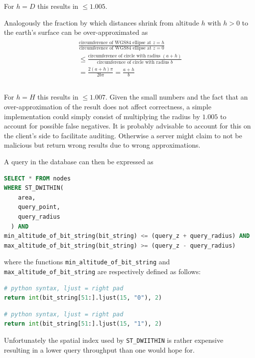 \documentclass[10pt,conference,compsocconf]{IEEEtran}
\begin{document}
For $h = D$ this results in $\leq 1.005$.

Analogously the fraction by which distances shrink from altitude $h$ with $h > 0$ to the earth's surface can be over-approximated as
\begin{align}
\begin{split}
	&\frac{\text{circumference of WGS84 ellipse at }z=h}{\text{circumference of WGS84 ellipse at }z=0}\\
	&\leq \frac{\text{circumference of circle with radius } (a+h)}{\text{circumference of circle with radius } b}\\
	&= \frac{2 (a+h) \pi}{2 b \pi} = \frac{a+h}{b}\\
	&\\
\end{split}
\end{align}

For $h = H$ this results in $\leq 1.007$.
Given the small numbers and the fact that an over-approximation of the result does not affect correctness, a simple implementation could simply consist of multiplying the radius by $1.005$ to account for possible false negatives.
It is probably advisable to account for this on the client's side to facilitate auditing.
Otherwise a server might claim to not be malicious but return wrong results due to wrong approximations.

A query in the database can then be expressed as

\begin{lstlisting}[language=SQL]
SELECT * FROM nodes
WHERE ST_DWITHIN(
    area,
    query_point,
    query_radius
  ) AND
min_altitude_of_bit_string(bit_string) <= (query_z + query_radius) AND
max_altitude_of_bit_string(bit_string) >= (query_z - query_radius)
\end{lstlisting}

where the functions \texttt{min\_altitude\_of\_bit\_string} and \texttt{max\_altitude\_of\_bit\_string} are respectively defined as follows:
\begin{lstlisting}[language=Python]
# python syntax, ljust = right pad
return int(bit_string[51:].ljust(15, "0"), 2)
\end{lstlisting}

\begin{lstlisting}[language=Python]
# python syntax, ljust = right pad
return int(bit_string[51:].ljust(15, "1"), 2)
\end{lstlisting}

Unfortunately the spatial index used by \texttt{ST\_DWIITHIN} is rather expensive resulting in a lower query throughput than one would hope for.
\end{document}
